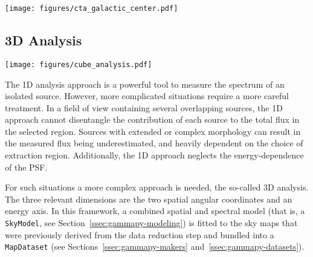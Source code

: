 \documentclass[traditabstract, longauth]{aa}
\newcommand{\code}[1]{\texttt{#1}}
\begin{document}
\begin{figure*}
	\centering
	\texttt{[image: figures/cta\_galactic\_center.pdf]}
	\caption{
		Example of 1D spectral analysis of the Galactic Center for three simulated CTA
		observations for the 1DC dataset. The left image shows the maps of counts with the measurement
		region in white and background regions overlaid in different colors. The right image
		shows the resulting spectral points and their corresponding log-likelihood
		profiles.} \label{fig:cta_galactic_center} \end{figure*}


\subsection{3D Analysis}
\label{ssec:3d-analysis}
%
\begin{figure*}[t]
	\centering
	\texttt{[image: figures/cube\_analysis.pdf]}
	\caption{Example of a 3D analysis for simulated sources with point-like, Gaussian
		and shell-like morphology. The simulation uses \textit{prod5} \irfs from \cta.
		The left image shows a significance map where the three simulated sources can be
		seen. The middle figure shows another significance map, but this time after
		subtracting the best-fit model for each of the sources, which are displayed in
		black. The right figure shows the contribution of each source model to the
		circular region of radius 0.5\textdegree drawn in the left image, together with
		the excess counts inside that region. } \label{fig:cube_analysis}
\end{figure*}
%
The 1D analysis approach is a powerful tool to measure the spectrum of an
isolated source. However, more complicated situations require a more careful
treatment. In a field of view containing several overlapping sources, the 1D
approach cannot disentangle the contribution of each source to the total flux in
the selected region. Sources with extended or complex morphology can result in
the measured flux being underestimated, and heavily dependent on the choice of
extraction region. Additionally, the 1D approach neglects the energy-dependence
of the PSF.

For such situations a more complex approach is needed, the so-called 3D
analysis. The three relevant dimensions are the two spatial angular coordinates
and an energy axis. In this framework, a combined spatial and spectral model
(that is, a \code{SkyModel}, see Section~\ref{ssec:gammapy-modeling}) is fitted to the
sky maps that were previously derived from the data reduction step and bundled into a
\code{MapDataset} (see Sections~\ref{ssec:gammapy-makers} and~\ref{ssec:gammapy-datasets}).
\end{document}
